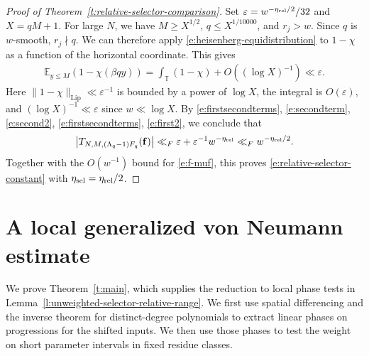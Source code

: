 \documentclass[12pt]{amsart}
\newcommand{\1}{\mathbf 1}
\theoremstyle{definition}
\begin{document}
\begin{proof}[Proof of Theorem~\ref{t:relative-selector-comparison}]
Set \(\varepsilon=w^{-\eta_{\rm rel}/2}/32\) and \(X=qM+1\).
For large \(N\), we have \(M\ge X^{1/2}\), \(q\le X^{1/10000}\),
and \(r_j>w\). Since \(q\) is \(w\)-smooth, \(r_j\nmid q\).
We can therefore apply \eqref{e:heisenberg-equidistribution}
to \(1-\chi\) as a function of the horizontal coordinate. This gives
\begin{align}\label{e:first2}
    \mathbb E_{y\le M}(1-\chi(\beta qy))
 =\int_{\mathbb T}(1-\chi)+O((\log X)^{-1})
 \ll\varepsilon.
\end{align}
Here \(\|1-\chi\|_{\mathrm{Lip}}\ll\varepsilon^{-1}\) is bounded
by a power of \(\log X\), the integral is \(O(\varepsilon)\),
and \((\log X)^{-1}\ll\varepsilon\) since \(w\ll\log X\). By \eqref{e:firstsecondterms}, \eqref{e:secondterm}, \eqref{e:second2}, \eqref{e:firstsecondterms}, \eqref{e:first2}, we conclude that
\[
 \bigl|T_{N,M,(\Lambda_q-1)F_q}(\mathbf f)\bigr|
 \ll_F \varepsilon+\varepsilon^{-1}w^{-\eta_{\rm rel}}
 \ll_F w^{-\eta_{\rm rel}/2}.
\]
Together with the \(O(w^{-1})\) bound for \eqref{e:f-muf}, this proves \eqref{e:relative-selector-constant}
with \(\eta_{\rm sel}=\eta_{\rm rel}/2\).
\end{proof}

\section{A local generalized von Neumann estimate}\label{s:local-vn}

We prove Theorem~\ref{t:main}, which supplies the reduction to
local phase tests in Lemma~\ref{l:unweighted-selector-relative-range}.
We first use spatial differencing and the inverse theorem for
distinct-degree polynomials to extract linear phases on
progressions for the shifted inputs. We then use those phases to
test the weight on short parameter intervals in fixed residue
classes. 
\end{document}
